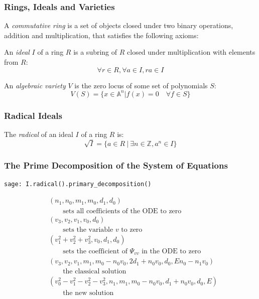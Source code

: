 \documentclass{beamer}
\begin{document}
\begin{frame}
\frametitle{Rings, Ideals and Varieties}
\begin{definition}
A {\it commutative ring} is a set of objects closed under two binary operations, addition and multiplication,
that satisfies the following axioms:
\end{definition}

\begin{definition}
An {\it ideal} $I$ of a ring $R$ is a subring of $R$ closed under multiplication with elements from $R$:
\[ \forall r \in R, \forall a \in I, ra \in I \]
\end{definition}

\begin{definition}
An {\it algebraic variety} $V$ is the zero locus of some set of polynomials $S$:
\[ V(S) = \{ x \in {\mathbb A}^n | f(x) = 0 \quad\forall f \in S \} \]
\end{definition}
\end{frame}

\begin{frame}
\frametitle{Radical Ideals}
\begin{definition}
The {\it radical} of an ideal $I$ of a ring $R$ is:
\[ \sqrt{I} = \{ a \in R \ | \ \exists n \in {\mathbb Z}, a^n \in I \} \]
\end{definition}
\end{frame}

\begin{frame}[fragile]
\frametitle{The Prime Decomposition of the System of Equations}
\begin{verbatim}
sage: I.radical().primary_decomposition()
\end{verbatim}

\begin{subequations}
\label{ideal}
\begin{align}
& \left(n_{1}, n_{0}, m_{1}, m_{0}, d_{1}, d_{0}\right)\label{ideal:5} \\
& \qquad \text{sets all coefficients of the ODE to zero} \nonumber \\
& \left(v_{3}, v_{2}, v_{1}, v_{0}, d_{0}\right)\label{ideal:4}\\
& \qquad \text{sets the variable $v$ to zero} \nonumber \\
& \left(v_{1}^{2} + v_{2}^{2} + v_{3}^{2}, v_{0}, d_{1}, d_{0}\right)\label{ideal:3}\\
& \qquad \text{sets the coefficient of $\Psi_{vv}$ in the ODE to zero} \nonumber \\
& \left(v_{3}, v_{2}, v_{1}, m_{1}, m_{0} - n_{0} v_{0}, 2 d_{1} + n_{0} v_{0}, d_{0}, E n_{0} - n_{1} v_{0}\right)\label{ideal:2}\\
& \qquad \text{the classical solution} \nonumber \\
& \left(v_{0}^{2} - v_{1}^{2} - v_{2}^{2} - v_{3}^{2}, n_{1}, m_{1}, m_{0} - n_{0} v_{0}, d_{1} + n_{0} v_{0}, d_{0}, E\right)\label{ideal:1}\\
& \qquad \text{the new solution} \nonumber
\end{align}
\end{subequations}
\end{frame}
\end{document}
